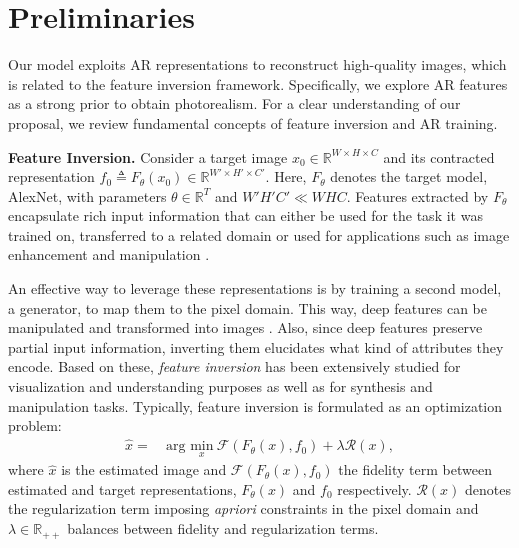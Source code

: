 \section{Preliminaries}
\label{sec:framework}
Our model exploits AR representations to reconstruct high-quality images, which is related to the feature inversion framework. Specifically, we explore AR features as a strong prior to obtain photorealism. For a clear understanding of our proposal, we review fundamental concepts of feature inversion and AR training.

{\bf Feature Inversion.}
Consider a target image $x_{0}\in \mathbb{R}^{W \times H \times C}$ and its contracted representation $f_{0}\triangleq F_{\theta}(x_{0})\in \mathbb{R}^{W'\times H'\times C'}$. Here, $F_{\theta}$ denotes the target model, \eg AlexNet, with parameters $\theta \in \mathbb{R}^{T}$ and $W'H'C'\ll WHC$. Features extracted by $F_{\theta}$ encapsulate rich input information that can either be used for the task it was trained on, transferred to a related domain \cite{pan_2009_survey} or  used for applications such as image enhancement and manipulation \cite{johnson_2016_perceptual,gatys_2016_image}.

An effective way to leverage these representations is by training a second model, a generator, to map them to the pixel domain. This way, deep features can be manipulated and transformed into images \cite{dosovitskiy_2015_inverting,dosovitskiy_2016_generating}. Also, since deep features preserve partial input information, inverting them elucidates what kind of attributes they encode. Based on these, \textit{feature inversion} \cite{simonyan_2013_deep,mahendran_2015_understanding,dosovitskiy_2015_inverting} has been extensively studied for visualization and understanding purposes as well as for synthesis and manipulation tasks. Typically, feature inversion is formulated as an optimization problem:
\begin{align}
    \hat{x}=&\ \text{arg } \underset{x}{\text{min}}\ \mathcal{F}(F_{\theta}(x), f_{0}) + \lambda \mathcal{R}(x),
\end{align}
where $\hat{x}$ is the estimated image and $\mathcal{F}(F_{\theta}(x), f_{0})$ the fidelity term between estimated and target representations, $F_{\theta}(x)$ and $f_{0}$ respectively. $\mathcal{R}(x)$ denotes the regularization term imposing \textit{apriori} constraints in the pixel domain and $\lambda \in \mathbb{R}_{++}$ balances between fidelity and regularization terms.

